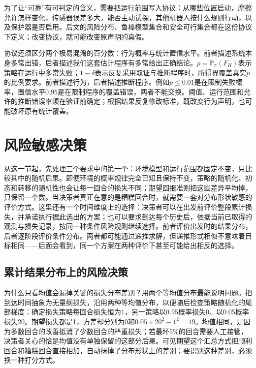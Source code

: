 为了让“可靠”有可判定的含义，需要把运行范围写入协议：从哪些位置启动，摩擦允许怎样变化，传感器误差多大，能否主动试探，其他机器人按什么规则行动，以及保护器是否启用。后文的风险分布、鲁棒模型集合和安全可行集合都在这份协议下定义；改变协议，就可能改变原声明的真假。

协议还须区分两个极易混淆的百分数：行为概率与统计置信水平。前者描述系统本身多常出错，后者描述我们这套估计程序有多常给出正确结论。$p=\mathbb P_\pi(F_H)$表示策略在运行中多常失败；$1-\delta$表示反复采用取证与推断程序时，所得界覆盖真实$p$的比例要求。前者描述行为，后者描述推断程序。例如$p\leq0.01$是在限制失败概率，置信水平$0.95$是在限制程序的覆盖错误，两者不能交换。阈值、运行范围和允许的推断错误率须在验证前确定；根据结果反复修改标准，既改变行为声明，也可能破坏原有统计覆盖。

\section{风险敏感决策}
\label{sec:rl-trustworthy-risk}

从这一节起，先处理三个要求中的第一个：环境模型和运行范围都固定不变，只比较其中的随机后果。即便环境的概率规律完全已知且保持不变，策略的随机化、初态和转移的随机性也会让每一回合的损失不同；期望回报准则把这些差异平均掉，只保留一个数。当决策者真正在意的是糟糕回合时，就需要一套对分布形状敏感的评价方式。这里还有一个时间维度上的选择：决策者可以在出发前评价整段累计损失，并承诺执行据此选出的方案；也可以要求到达每个历史后，依据当前已取得的观测与损失记录，按同一种条件风险规则继续选择。前者评价出发时的结果分布，后者逐阶段评价条件分布。两者都可能通过递推求解，但递推形式相似不意味着目标相同——后面会看到，同一个方案在两种评价下甚至可能给出相反的选择。

\subsection{累计结果分布上的风险决策}
\label{sec:rl-trustworthy-static-risk}

为什么只看均值会漏掉关键的损失分布差别？用两个等均值分布最能说明问题。把到达时间抽象为无量纲损失，沿用两种等均值分布，以便随后检查策略随机化的尾部梯度：确定损失策略每回合损失恒为1，另一策略以0.95概率损失0、以0.05概率损失20。期望损失都是1，方差却分别为0和$0.05\times20^2-1^2=19$。均值相同，是因为多数回合的改善抵消了少数回合的严重损失；若最坏5\%的回合需要人工接管，决策者关心的恰是均值没有单独保留的这部分后果。可见期望这个汇总方式把顺利回合和糟糕回合直接相加，自动抹掉了分布形状上的差别；要识别这种差别，必须换一种打分方式。


